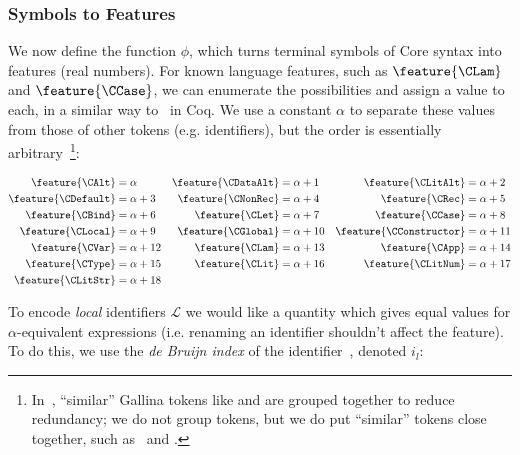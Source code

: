 \subsubsection{Symbols to Features}
\label{sec:symbolstofeatures}

We now define the function $\phi$, which turns terminal symbols of Core syntax
into features (real numbers). For known language features, such as
$\feature{\CLam}$ and $\feature{\CCase}$, we can enumerate the possibilities and
assign a value to each, in a similar way to~\cite{DBLP:journals/corr/HerasK14}
in Coq. We use a constant $\alpha$ to separate these values from those of other
tokens (e.g. identifiers), but the order is essentially
arbitrary~\footnote{In~\cite{DBLP:journals/corr/HerasK14}, ``similar'' Gallina
  tokens like  and  are grouped together to reduce
  redundancy; we do not group tokens, but we do put ``similar'' tokens close
  together, such as \CLocal\ and \CGlobal.}:

\begin{equation} \label{eq:feature}
  \begin{aligned}
    \feature{\CAlt}          &= \alpha      &
    \feature{\CDataAlt}      &= \alpha + 1  &
    \feature{\CLitAlt}       &= \alpha + 2  \\
    \feature{\CDefault}      &= \alpha + 3  &
    \feature{\CNonRec}       &= \alpha + 4  &
    \feature{\CRec}          &= \alpha + 5  \\
    \feature{\CBind}         &= \alpha + 6  &
    \feature{\CLet}          &= \alpha + 7  &
    \feature{\CCase}         &= \alpha + 8  \\
    \feature{\CLocal}        &= \alpha + 9  &
    \feature{\CGlobal}       &= \alpha + 10 &
    \feature{\CConstructor}  &= \alpha + 11 \\
    \feature{\CVar}          &= \alpha + 12 &
    \feature{\CLam}          &= \alpha + 13 &
    \feature{\CApp}          &= \alpha + 14 \\
    \feature{\CType}         &= \alpha + 15 &
    \feature{\CLit}          &= \alpha + 16 &
    \feature{\CLitNum}       &= \alpha + 17 \\
    \feature{\CLitStr}       &= \alpha + 18
  \end{aligned}
\end{equation}

To encode \emph{local} identifiers $\mathcal{L}$ we would like a quantity which
gives equal values for $\alpha$-equivalent expressions (i.e. renaming an
identifier shouldn't affect the feature). To do this, we use the \emph{de Bruijn
  index} of the identifier~\cite{de1972lambda}, denoted $i_l$:

